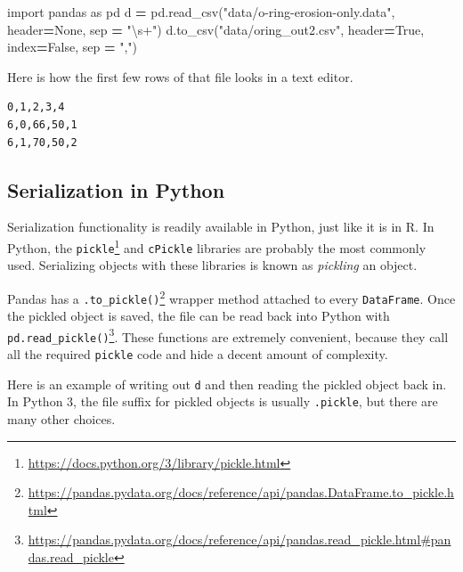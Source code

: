 \documentclass[
  12pt,
  krantz2]{krantz}
\makeatletter
\newenvironment{Shaded}{\begin{snugshade}}{\end{snugshade}}
\newcommand{\ImportTok}[1]{#1}
\newcommand{\NormalTok}[1]{#1}
\newcommand{\OperatorTok}[1]{\textcolor[rgb]{0.43,0.43,0.43}{\textbf{#1}}}
\newcommand{\StringTok}[1]{\textcolor[rgb]{0.5,0.5,0.5}{#1}}
\newcommand{\VariableTok}[1]{\textcolor[rgb]{0,0,0}{#1}}
\renewcommand{\href}[2]{#2\footnote{\url{#1}}}
\newenvironment{kframe}{%
\medskip{}
\setlength{\fboxsep}{.8em}
 \def\at@end@of@kframe{}%
 \ifinner\ifhmode%
  \def\at@end@of@kframe{\end{minipage}}%
  \begin{minipage}{\columnwidth}%
 \fi\fi%
 \def\FrameCommand##1{\hskip\@totalleftmargin \hskip-\fboxsep
 \colorbox{shadecolor}{##1}\hskip-\fboxsep
     \hskip-\linewidth \hskip-\@totalleftmargin \hskip\columnwidth}%
 \MakeFramed {\advance\hsize-\width
   \@totalleftmargin\z@ \linewidth\hsize
   \@setminipage}}%
 {\par\unskip\endMakeFramed%
 \at@end@of@kframe}
\renewenvironment{Shaded}{\begin{kframe}}{\end{kframe}}
\makeatother
\begin{document}
\begin{Shaded}
\begin{Highlighting}[]
\ImportTok{import}\NormalTok{ pandas }\ImportTok{as}\NormalTok{ pd}
\NormalTok{d }\OperatorTok{=}\NormalTok{ pd.read\_csv(}\StringTok{"data/o{-}ring{-}erosion{-}only.data"}\NormalTok{, }
\NormalTok{                  header}\OperatorTok{=}\VariableTok{None}\NormalTok{, sep }\OperatorTok{=} \StringTok{"\textbackslash{}s+"}\NormalTok{)}
\NormalTok{d.to\_csv(}\StringTok{"data/oring\_out2.csv"}\NormalTok{, }
\NormalTok{          header}\OperatorTok{=}\VariableTok{True}\NormalTok{, index}\OperatorTok{=}\VariableTok{False}\NormalTok{, sep }\OperatorTok{=} \StringTok{","}\NormalTok{)}
\end{Highlighting}
\end{Shaded}

Here is how the first few rows of that file looks in a text editor.

\begin{verbatim}
0,1,2,3,4
6,0,66,50,1
6,1,70,50,2
\end{verbatim}

\hypertarget{serialization-in-python}{%
\subsection{Serialization in Python}\label{serialization-in-python}}

Serialization functionality is readily available in Python, just like it is in R. In Python, the \href{https://docs.python.org/3/library/pickle.html}{\texttt{pickle}} and \texttt{cPickle} libraries are probably the most commonly used. Serializing objects with these libraries is known as \emph{pickling} an object.

Pandas has a \href{https://pandas.pydata.org/docs/reference/api/pandas.DataFrame.to_pickle.html}{\texttt{.to\_pickle()}} wrapper method attached to every \texttt{DataFrame}. Once the pickled object is saved, the file can be read back into Python with \href{https://pandas.pydata.org/docs/reference/api/pandas.read_pickle.html\#pandas.read_pickle}{\texttt{pd.read\_pickle()}}. These functions are extremely convenient, because they call all the required \texttt{pickle} code and hide a decent amount of complexity.

Here is an example of writing out \texttt{d} and then reading the pickled object back in. In Python 3, the file suffix for pickled objects is usually \texttt{.pickle}, but there are many other choices.
\end{document}
